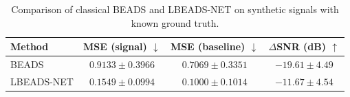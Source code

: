 
\begin{table}[htbp]
\centering
\caption{Comparison of classical BEADS and LBEADS-NET on synthetic signals with known ground truth.}
\label{tab:comparison}
\begin{tabular}{lccc}
\toprule
\textbf{Method} & \textbf{MSE (signal) $\downarrow$} & \textbf{MSE (baseline) $\downarrow$} & \textbf{$\Delta$SNR (dB) $\uparrow$} \\
\midrule
BEADS & $0.9133 \pm 0.3966$ & $0.7069 \pm 0.3351$ & $-19.61 \pm 4.49$ \\
LBEADS-NET & $0.1549 \pm 0.0994$ & $0.1000 \pm 0.1014$ & $-11.67 \pm 4.54$ \\

\bottomrule
\end{tabular}
\end{table}
